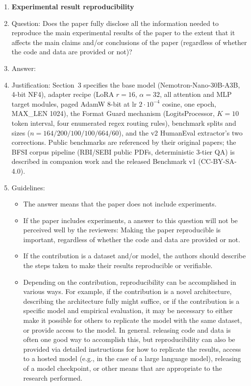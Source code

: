 \begin{enumerate}
    \item {\bf Experimental result reproducibility}
    \item[] Question: Does the paper fully disclose all the information needed to reproduce the main experimental results of the paper to the extent that it affects the main claims and/or conclusions of the paper (regardless of whether the code and data are provided or not)?
    \item[] Answer: \answerYes{}
    \item[] Justification: Section~3 specifies the base model (Nemotron-Nano-30B-A3B, 4-bit NF4), adapter recipe (LoRA $r{=}16$, $\alpha{=}32$, all attention and MLP target modules, paged AdamW 8-bit at lr $2{\cdot}10^{-4}$ cosine, one epoch, MAX\_LEN 1024), the Format Guard mechanism (LogitsProcessor, $K{=}10$ token interval, four enumerated regex routing rules), benchmark splits and sizes ($n{=}164/200/100/100/664/60$), and the v2 HumanEval extractor's two corrections. Public benchmarks are referenced by their original papers; the BFSI corpus pipeline (RBI/SEBI public PDFs, deterministic 3-tier QA) is described in companion work and the released Benchmark v1 (CC-BY-SA-4.0).
    \item[] Guidelines:
    \begin{itemize}
        \item The answer \answerNA{} means that the paper does not include experiments.
        \item If the paper includes experiments, a \answerNo{} answer to this question will not be perceived well by the reviewers: Making the paper reproducible is important, regardless of whether the code and data are provided or not.
        \item If the contribution is a dataset and\slash or model, the authors should describe the steps taken to make their results reproducible or verifiable. 
        \item Depending on the contribution, reproducibility can be accomplished in various ways. For example, if the contribution is a novel architecture, describing the architecture fully might suffice, or if the contribution is a specific model and empirical evaluation, it may be necessary to either make it possible for others to replicate the model with the same dataset, or provide access to the model. In general. releasing code and data is often one good way to accomplish this, but reproducibility can also be provided via detailed instructions for how to replicate the results, access to a hosted model (e.g., in the case of a large language model), releasing of a model checkpoint, or other means that are appropriate to the research performed.

\end{itemize}
\end{enumerate}
